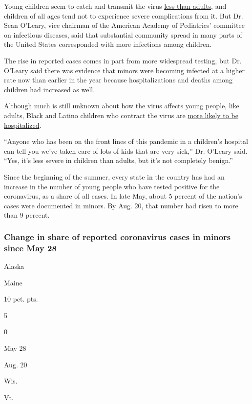 Young children seem to catch and transmit the virus
\href{https://www.nytimes3xbfgragh.onion/2020/07/20/parenting/coronavirus-children-spread-covid-19.html}{less
than adults}, and children of all ages tend not to experience severe
complications from it. But Dr. Sean O'Leary, vice chairman of the
American Academy of Pediatrics' committee on infectious diseases, said
that substantial community spread in many parts of the United States
corresponded with more infections among children.

The rise in reported cases comes in part from more widespread testing,
but Dr. O'Leary said there was evidence that minors were becoming
infected at a higher rate now than earlier in the year because
hospitalizations and deaths among children had increased as well.

Although much is still unknown about how the virus affects young people,
like adults, Black and Latino children who contract the virus are
\href{https://www.cdc.gov/mmwr/volumes/69/wr/mm6932e3.htm}{more likely
to be hospitalized}.

``Anyone who has been on the front lines of this pandemic in a
children's hospital can tell you we've taken care of lots of kids that
are very sick,'' Dr. O'Leary said. ``Yes, it's less severe in children
than adults, but it's not completely benign.''

Since the beginning of the summer, every state in the country has had an
increase in the number of young people who have tested positive for the
coronavirus, as a share of all cases. In late May, about 5 percent of
the nation's cases were documented in minors. By Aug. 20, that number
had risen to more than 9 percent.

\hypertarget{change-in-share-of-reported-coronavirus-cases-in-minors-since-may-28}{%
\subsubsection{Change in share of reported coronavirus cases in minors
since May
28}\label{change-in-share-of-reported-coronavirus-cases-in-minors-since-may-28}}

Alaska

Maine

10 pct. pts.

5

0

May 28

Aug. 20

Wis.

Vt.

